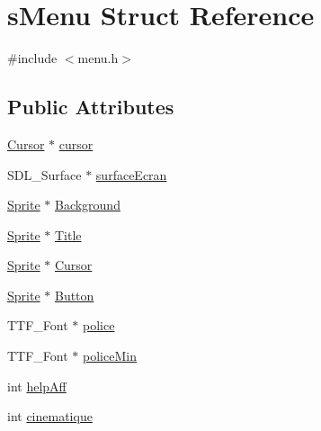 \hypertarget{structs_menu}{\section{s\-Menu Struct Reference}
\label{structs_menu}
}


{\ttfamily \#include $<$menu.\-h$>$}

\subsection*{Public Attributes}
\begin{DoxyCompactItemize}
\item 
\hyperlink{interface_8h_a2cc6eac3d76a3bead2da75d8bcd3ef05}{Cursor} $\ast$ \hyperlink{structs_menu_a85643ef7ac4e03b8d740ae93f03c23d2}{cursor}
\item 
S\-D\-L\-\_\-\-Surface $\ast$ \hyperlink{structs_menu_a95c803d0d70319d9adde92ef353b183c}{surface\-Ecran}
\item 
\hyperlink{struct_sprite}{Sprite} $\ast$ \hyperlink{structs_menu_a0124a11c88019763ee2a4ce8498ebc5e}{Background}
\item 
\hyperlink{struct_sprite}{Sprite} $\ast$ \hyperlink{structs_menu_a2551447b30a0bc7136a538f59d537260}{Title}
\item 
\hyperlink{struct_sprite}{Sprite} $\ast$ \hyperlink{structs_menu_adc47799ebb3767570f71ada062542ba1}{Cursor}
\item 
\hyperlink{struct_sprite}{Sprite} $\ast$ \hyperlink{structs_menu_a203f5f3712aa084f7e411dff36a4dc16}{Button}
\item 
T\-T\-F\-\_\-\-Font $\ast$ \hyperlink{structs_menu_a9b0a8085e6305f21d8a4760ad1adcf1e}{police}
\item 
T\-T\-F\-\_\-\-Font $\ast$ \hyperlink{structs_menu_a2cdd8a1ea767c51bf201c34c2973f876}{police\-Min}
\item 
int \hyperlink{structs_menu_a42f4cbc6bb069bd62e88df596cba100a}{help\-Aff}
\item 
int \hyperlink{structs_menu_aa583b6e18415c5f3a650f553a501a192}{cinematique}
\end{DoxyCompactItemize}


